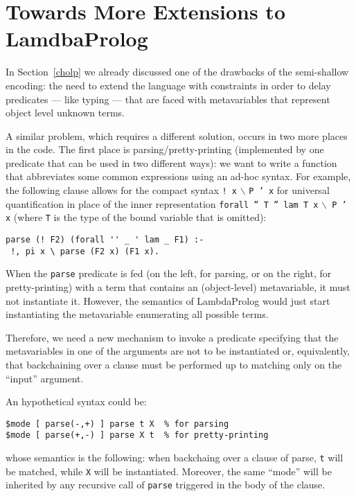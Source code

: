 \documentclass[preprint]{sigplanconf}
\begin{document}
\section{Towards More Extensions to LamdbaProlog}

In Section~\ref{cholp} we already discussed one of the drawbacks of the semi-shallow encoding: the need to extend the language with constraints in order to delay predicates --- like typing --- that are faced with metavariables that represent object level unknown terms.

A similar problem, which requires a different solution, occurs in two more places in the code. The first place is parsing/pretty-printing (implemented by one predicate that can be used in two different ways): we want to write a function that abbreviates some common expressions using an ad-hoc syntax. For example, the following clause allows for the compact syntax \texttt{! x} $\backslash $ \texttt{P ' x} for universal quantification in place of the inner representation \texttt{forall '' T '' lam T x} $\backslash $\texttt{ P ' x} (where \texttt{T} is the type of the bound variable that is omitted):
{\small
\begin{verbatim}
parse (! F2) (forall '' _ ' lam _ F1) :-
 !, pi x \ parse (F2 x) (F1 x).
\end{verbatim}
}

When the \verb+parse+ predicate is fed (on the left, for parsing, or on the right, for pretty-printing) with a term that contains an (object-level) metavariable, it must not instantiate it. However, the semantics of LambdaProlog would just start instantiating the metavariable enumerating all possible terms.

Therefore, we need a new mechanism to invoke a predicate specifying that the metavariables in one of the arguments are not to be instantiated or, equivalently, that backchaining over a clause must be performed up to matching only on the ``input'' argument.

An hypothetical syntax could be:

{\small
\begin{verbatim}
$mode [ parse(-,+) ] parse t X  % for parsing
$mode [ parse(+,-) ] parse X t  % for pretty-printing
\end{verbatim}}

whose semantics is the following: when backchaing over a clause of parse, \verb+t+
will be matched, while \verb+X+ will be instantiated. Moreover, the same ``mode'' will be inherited by any recursive call of \verb+parse+ triggered in the body of the clause.
\end{document}
